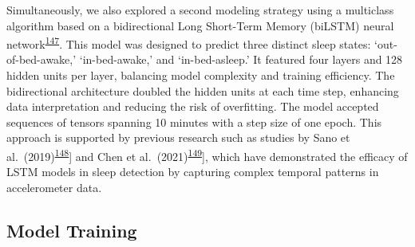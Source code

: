 \documentclass[
  10pt,
]{scrbook}
\begin{document}
Simultaneously, we also explored a second modeling strategy using a
multiclass algorithm based on a bidirectional Long Short-Term Memory
(biLSTM) neural
network\textsuperscript{\protect\hyperlink{ref-hochreiter_long_1997}{147}}.
This model was designed to predict three distinct sleep states:
`out-of-bed-awake,' `in-bed-awake,' and `in-bed-asleep.' It featured
four layers and 128 hidden units per layer, balancing model complexity
and training efficiency. The bidirectional architecture doubled the
hidden units at each time step, enhancing data interpretation and
reducing the risk of overfitting. The model accepted sequences of
tensors spanning 10 minutes with a step size of one epoch. This approach
is supported by previous research such as studies by Sano et
al.~(2019)\textsuperscript{\protect\hyperlink{ref-sano_multimodal_2019}{148}}{]}
and Chen et
al.~(2021)\textsuperscript{\protect\hyperlink{ref-chen_attention_2021}{149}}{]},
which have demonstrated the efficacy of LSTM models in sleep detection
by capturing complex temporal patterns in accelerometer data.

\hypertarget{model-training}{%
\subsection{Model Training}\label{model-training}}
\end{document}
